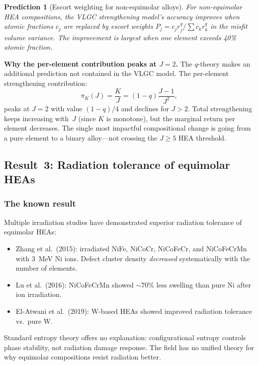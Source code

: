 \documentclass[12pt,letterpaper]{article}
\newtheorem{prediction}[theorem]{Prediction}
\theoremstyle{definition}
\begin{document}
\begin{prediction}[Escort weighting for non-equimolar alloys]
For non-equimolar HEA compositions, the VLGC strengthening model's accuracy improves when atomic fractions $c_j$ are replaced by escort weights $P_j = c_j r_j^q / \sum c_k r_k^q$ in the misfit volume variance.  The improvement is largest when one element exceeds 40\% atomic fraction.
\end{prediction}

\textbf{Why the per-element contribution peaks at $J = 2$.}  The $q$-theory makes an additional prediction not contained in the VLGC model.  The per-element strengthening contribution:
\begin{equation}
  \pi_K(J) = \frac{K}{J} = (1-q)\frac{J-1}{J^2},
\end{equation}
peaks at $J = 2$ with value $(1-q)/4$ and declines for $J > 2$.  Total strengthening keeps increasing with~$J$ (since $K$ is monotone), but the marginal return per element decreases.  The single most impactful compositional change is going from a pure element to a binary alloy---not crossing the $J \geq 5$ HEA threshold.


\subsection{Result~3: Radiation tolerance of equimolar HEAs}

\subsubsection{The known result}

Multiple irradiation studies have demonstrated superior radiation tolerance of equimolar HEAs:
\begin{itemize}
  \item Zhang et al.\ (2015): irradiated NiFe, NiCoCr, NiCoFeCr, and NiCoFeCrMn with 3~MeV Ni ions.  Defect cluster density \emph{decreased} systematically with the number of elements.
  \item Lu et al.\ (2016): NiCoFeCrMn showed $\sim$70\% less swelling than pure Ni after ion irradiation.
  \item El-Atwani et al.\ (2019): W-based HEAs showed improved radiation tolerance vs.\ pure W.
\end{itemize}

Standard entropy theory offers no explanation: configurational entropy controls phase stability, not radiation damage response.  The field has no unified theory for why equimolar compositions resist radiation better.
\end{document}
